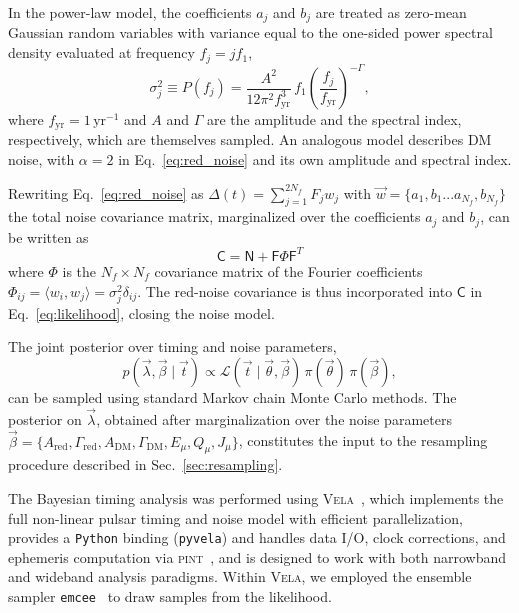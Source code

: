 \documentclass[
    floats,
    floatfix,
    amssymb,
    prd,
    twocolumn,
    superscriptaddress,
    nofootinbib,
    unicode,
    colorlinks=true,
    linktocpage=true
]{revtex4-2}
\begin{document}
In the power-law model, the coefficients $a_j$ and $b_j$ are treated as
zero-mean Gaussian random variables with variance equal to the one-sided
power spectral density evaluated at frequency $f_j = j f_1$,
\begin{equation}
    \sigma_j^2 \equiv P(f_j)
    = \frac{A^2}{12\pi^2 f_\mathrm{yr}^3}\,
      f_1\!\left(\frac{f_j}{f_\mathrm{yr}}\right)^{-\Gamma},
\label{eq:powerlaw}
\end{equation}
where $f_\mathrm{yr} = 1\,\mathrm{yr}^{-1}$ and $A$ and $\Gamma$ are the amplitude and the spectral index, respectively, which are themselves sampled. An analogous model describes DM noise, with $\alpha = 2$ in
Eq.~\eqref{eq:red_noise} and its own amplitude and spectral index.

Rewriting Eq.~\eqref{eq:red_noise} as $\Delta(t)=\sum_{j=1}^{2N_f} F_j w_j$ with $\vec{w}=\{a_1,b_1...a_{N_f},b_{N_f}\}$ the total noise covariance matrix, marginalized over the coefficients $a_j$ and $b_j$, can be written as~\cite{PhysRevD.87.104021}
\begin{equation}
\mathsf{C}=\mathsf{N}+\mathsf{F}\mathsf{\Phi} \mathsf{F}^T
\end{equation}
where $\Phi$ is the $N_f\times N_f$ covariance matrix of the Fourier coefficients $\mathsf{\Phi}_{ij}=\langle w_i,w_j\rangle=\sigma_j^2\delta_{ij}$. The red-noise covariance is thus incorporated into $\mathsf{C}$ in Eq.~\eqref{eq:likelihood}, closing the noise model. 

The joint posterior over timing and noise parameters,
\begin{equation}
    p(\vec{\lambda},\vec{\beta}\mid\vec{t})
    \propto \mathcal{L}(\vec{t}\mid\vec{\theta},\vec{\beta})\,
    \pi(\vec{\theta})\,\pi(\vec{\beta}),
\label{eq:posterior}
\end{equation}
can be sampled using standard Markov chain Monte Carlo methods. The posterior on $\vec{\lambda}$, obtained after marginalization over the noise 
parameters $\vec{\beta} = \{A_\mathrm{red}, \Gamma_\mathrm{red}, A_\mathrm{DM}, 
\Gamma_\mathrm{DM}, E_\mu, Q_\mu, J_\mu\}$, constitutes the input to the resampling procedure 
described in Sec.~\ref{sec:resampling}.

The Bayesian timing analysis was performed using \textsc{Vela}~\cite{Susobhanan:2024yef},
which implements the full non-linear pulsar timing and noise model with efficient parallelization,
provides a \texttt{Python} binding (\texttt{pyvela}) and handles data I/O, clock corrections,
and ephemeris computation via \textsc{pint}~\cite{Luo:2020ksx, Susobhanan:2024gzf}, and is designed to work with both narrowband and wideband analysis paradigms. Within \textsc{Vela}, we employed the ensemble sampler \texttt{emcee}~\cite{Foreman-Mackey:2012any} to draw samples from the likelihood. 
  
\end{document}
